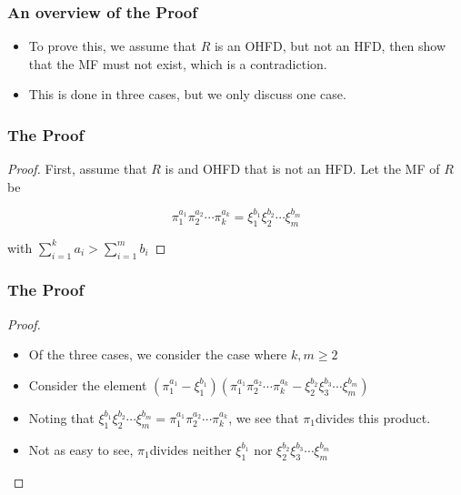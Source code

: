 \begin{frame}
  \frametitle{An overview of the Proof}
  \begin{itemize}
    \item To prove this, we assume that $R$ is an OHFD, but not an HFD, then show that the MF must not exist, which is a contradiction.
    \item This is done in three cases, but we only discuss one case.
  \end{itemize}
\end{frame}

\begin{frame}
  \frametitle{The Proof}
  \begin{proof}
    First, assume that $R$ is and OHFD that is not an HFD. Let the MF of $R$ be 

      $$\pi_{1}^{a_{1}}\pi_{2}^{a_{2}}\cdots\pi_{k}^{a_{k}}=  \xi_{1}^{b_{1}}\xi_{2}^{b_{2}}\cdots\xi_{m}^{b_{m}}$$

    with $\sum_{i=1}^{k}a_{i}>\sum_{i=1}^{m}b_{i}$
    \noqedsymbol
  \end{proof}
\end{frame}

\begin{frame}
  \frametitle{The Proof}
  \begin{proof}
    \begin{itemize}
      \item<1-> Of the three cases, we consider the case where $k,m \geq 2$
      \item<2-> Consider the element $(\pi_{1}^{a_{1}}-\xi_{1}^{b_{1}})(\pi_{1}^{a_{1}}\pi_{2}^{a_{2}}\cdots\pi_{k}^{a_{k}}-\xi_{2}^{b_{2}}\xi_{3}^{b_{3}}\cdots\xi_{m}^{b_{m}})$
      \item<3-> Noting that $\xi_{1}^{b_{1}}\xi_{2}^{b_{2}}\cdots\xi_{m}^{b_{m}}=\pi_{1}^{a_{1}}\pi_{2}^{a_{2}}\cdots\pi_{k}^{a_{k}}$, we see that $\pi_{1}$divides this product. 
      \item<4-> Not as easy to see, $\pi_{1}$divides neither $\xi_{1}^{b_{1}}$ nor $\xi_{2}^{b_{2}}\xi_{3}^{b_{3}}\cdots\xi_{m}^{b_{m}}$
    \end{itemize}
    \noqedsymbol
  \end{proof}
\end{frame}

